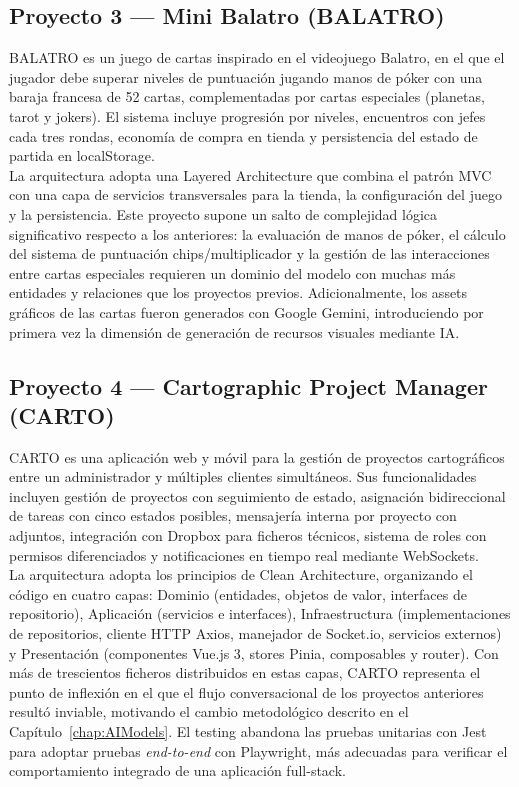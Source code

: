 \subsection{Proyecto 3 — Mini Balatro (\ac{BALATRO})} \label{subsec:p3-balatro}

\ac{BALATRO} es un juego de cartas inspirado en el videojuego Balatro, en el que el jugador debe superar niveles de puntuación jugando manos de póker con una baraja francesa de 52 cartas, complementadas por cartas especiales (planetas, tarot y jokers).
El sistema incluye progresión por niveles, encuentros con jefes cada tres rondas, economía de compra en tienda y persistencia del estado de partida en localStorage.\\

La arquitectura adopta una Layered Architecture que combina el patrón \ac{MVC} con una capa de servicios transversales para la tienda, la configuración del juego y la persistencia.
Este proyecto supone un salto de complejidad lógica significativo respecto a los anteriores: la evaluación de manos de póker, el cálculo del sistema de puntuación chips/multiplicador y la gestión de las interacciones entre cartas especiales requieren un dominio del modelo con muchas más entidades y relaciones que los proyectos previos.
Adicionalmente, los assets gráficos de las cartas fueron generados con Google Gemini, introduciendo por primera vez la dimensión de generación de recursos visuales mediante \ac{IA}.\\

\subsection{Proyecto 4 — Cartographic Project Manager (\ac{CARTO})} \label{subsec:p4-carto}

\ac{CARTO} es una aplicación web y móvil para la gestión de proyectos cartográficos entre un administrador y múltiples clientes simultáneos.
Sus funcionalidades incluyen gestión de proyectos con seguimiento de estado, asignación bidireccional de tareas con cinco estados posibles, mensajería interna por proyecto con adjuntos, integración con Dropbox para ficheros técnicos, sistema de roles con permisos diferenciados y notificaciones en tiempo real mediante WebSockets.\\

La arquitectura adopta los principios de Clean Architecture, organizando el código en cuatro capas: Dominio (entidades, objetos de valor, interfaces de repositorio), Aplicación (servicios e interfaces), Infraestructura (implementaciones de repositorios, cliente HTTP Axios, manejador de Socket.io, servicios externos) y Presentación (componentes Vue.js 3, stores Pinia, composables y router).
Con más de trescientos ficheros distribuidos en estas capas, \ac{CARTO} representa el punto de inflexión en el que el flujo conversacional de los proyectos anteriores resultó inviable, motivando el cambio metodológico descrito en el Capítulo~\ref{chap:AIModels}.
El testing abandona las pruebas unitarias con Jest para adoptar pruebas \textit{end-to-end} con Playwright, más adecuadas para verificar el comportamiento integrado de una aplicación full-stack.\\

